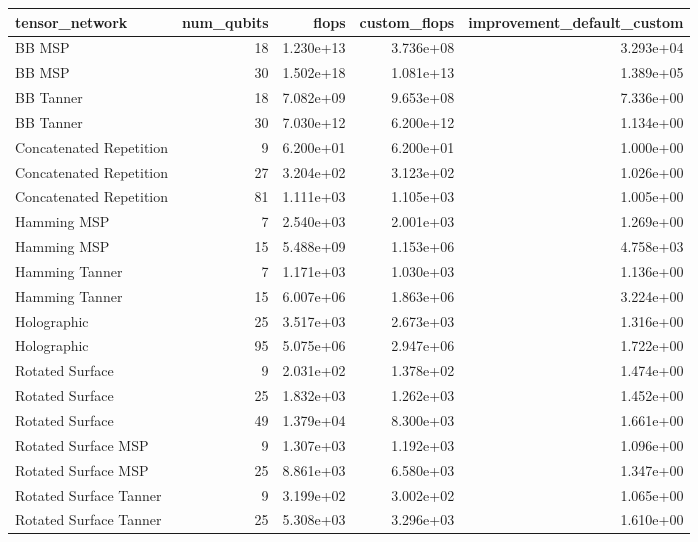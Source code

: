 \begin{tabular}{lrrrr}
\toprule
tensor_network & num_qubits & flops & custom_flops & improvement_default_custom \\
\midrule
BB MSP & 18 & 1.230e+13 & 3.736e+08 & 3.293e+04 \\
BB MSP & 30 & 1.502e+18 & 1.081e+13 & 1.389e+05 \\
BB Tanner & 18 & 7.082e+09 & 9.653e+08 & 7.336e+00 \\
BB Tanner & 30 & 7.030e+12 & 6.200e+12 & 1.134e+00 \\
Concatenated Repetition & 9 & 6.200e+01 & 6.200e+01 & 1.000e+00 \\
Concatenated Repetition & 27 & 3.204e+02 & 3.123e+02 & 1.026e+00 \\
Concatenated Repetition & 81 & 1.111e+03 & 1.105e+03 & 1.005e+00 \\
Hamming MSP & 7 & 2.540e+03 & 2.001e+03 & 1.269e+00 \\
Hamming MSP & 15 & 5.488e+09 & 1.153e+06 & 4.758e+03 \\
Hamming Tanner & 7 & 1.171e+03 & 1.030e+03 & 1.136e+00 \\
Hamming Tanner & 15 & 6.007e+06 & 1.863e+06 & 3.224e+00 \\
Holographic & 25 & 3.517e+03 & 2.673e+03 & 1.316e+00 \\
Holographic & 95 & 5.075e+06 & 2.947e+06 & 1.722e+00 \\
Rotated Surface & 9 & 2.031e+02 & 1.378e+02 & 1.474e+00 \\
Rotated Surface & 25 & 1.832e+03 & 1.262e+03 & 1.452e+00 \\
Rotated Surface & 49 & 1.379e+04 & 8.300e+03 & 1.661e+00 \\
Rotated Surface MSP & 9 & 1.307e+03 & 1.192e+03 & 1.096e+00 \\
Rotated Surface MSP & 25 & 8.861e+03 & 6.580e+03 & 1.347e+00 \\
Rotated Surface Tanner & 9 & 3.199e+02 & 3.002e+02 & 1.065e+00 \\
Rotated Surface Tanner & 25 & 5.308e+03 & 3.296e+03 & 1.610e+00 \\
\bottomrule
\end{tabular}
